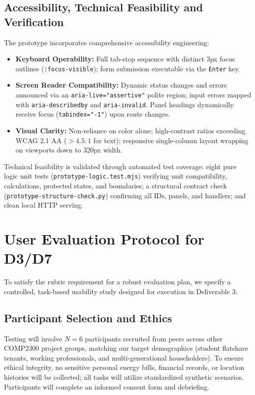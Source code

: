 \documentclass[12pt,a4paper]{article}
\newcommand{\code}[1]{\texttt{#1}}
\begin{document}
\subsection{Accessibility, Technical Feasibility and Verification}
The prototype incorporates comprehensive accessibility engineering:
\begin{itemize}[leftmargin=*]
  \item \textbf{Keyboard Operability:} Full tab-stop sequence with distinct 3px focus outlines (\code{:focus-visible}); form submission executable via the \code{Enter} key.
  \item \textbf{Screen Reader Compatibility:} Dynamic status changes and errors announced via an \code{aria-live="assertive"} polite region; input errors mapped with \code{aria-describedby} and \code{aria-invalid}. Panel headings dynamically receive focus (\code{tabindex="-1"}) upon route changes.
  \item \textbf{Visual Clarity:} Non-reliance on color alone; high-contrast ratios exceeding WCAG 2.1 AA ($>4.5:1$ for text); responsive single-column layout wrapping on viewports down to 320px width.
\end{itemize}
Technical feasibility is validated through automated test coverage: eight pure logic unit tests (\code{prototype-logic.test.mjs}) verifying unit compatibility, calculations, protected states, and boundaries; a structural contract check (\code{prototype-structure-check.py}) confirming all IDs, panels, and handlers; and clean local HTTP serving.

\section{User Evaluation Protocol for D3/D7}

To satisfy the rubric requirement for a robust evaluation plan, we specify a controlled, task-based usability study designed for execution in Deliverable 3:

\subsection{Participant Selection and Ethics}
Testing will involve $N=6$ participants recruited from peers across other COMP2300 project groups, matching our target demographics (student flatshare tenants, working professionals, and multi-generational householders). To ensure ethical integrity, no sensitive personal energy bills, financial records, or location histories will be collected; all tasks will utilize standardized synthetic scenarios. Participants will complete an informed consent form and debriefing.
\end{document}
